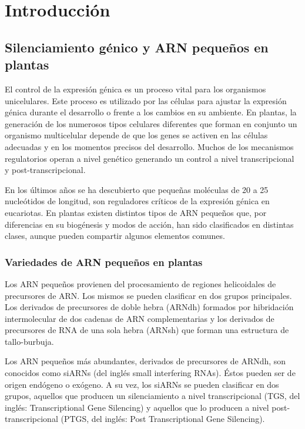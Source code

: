 \graphicspath{{Introduccion/Figs/}}

\setcounter{chapter}{1}
\chapter*{Introducción} 
\setcounter{figure}{0}
\setcounter{table}{0}
\setcounter{section}{0}

\section{Silenciamiento génico y ARN pequeños en plantas}

El control de la expresión génica es un proceso vital para los organismos unicelulares.
Este proceso es utilizado por las células para ajustar la expresión génica durante el desarrollo o frente a los cambios en su ambiente.
En plantas, la generación de los numerosos tipos celulares diferentes que forman en conjunto un organismo multicelular depende de que los genes se activen en las células adecuadas y en los momentos precisos del desarrollo.
Muchos de los mecanismos regulatorios operan a nivel genético generando un control a nivel transcripcional y post-transcripcional.

En los últimos años se ha descubierto que pequeñas moléculas de 20 a 25 nucleótidos de longitud, son reguladores críticos de la expresión génica en eucariotas.
En plantas existen distintos tipos de ARN pequeños que, por diferencias en su biogénesis y modos de acción, han sido clasificados en distintas clases, aunque pueden compartir algunos elementos comunes.

\subsection{Variedades de ARN pequeños en plantas}
Los ARN pequeños provienen del procesamiento de regiones helicoidales de precursores de ARN.
Los mismos se pueden clasificar en dos grupos principales. 
Los derivados de precursores de doble hebra (ARNdh) formados por hibridación intermolecular de dos cadenas de ARN complementarias y los derivados de precursores de RNA de una sola hebra (ARNsh) que forman una estructura de tallo-burbuja.

Los ARN pequeños más abundantes, derivados de precursores de ARNdh, son conocidos como siARNs (del inglés small interfering RNAs). 
Éstos pueden ser de origen endógeno o exógeno.
A su vez, los siARNs se pueden clasificar en dos grupos, aquellos que producen un silenciamiento a nivel transcripcional (TGS, del inglés: Transcriptional Gene Silencing) \citep{pmid17943195, Voinnet2009669} y aquellos que lo producen a nivel post-transcripcional (PTGS, del inglés: Post Transcriptional Gene Silencing)\citep{pmid10542148}.

